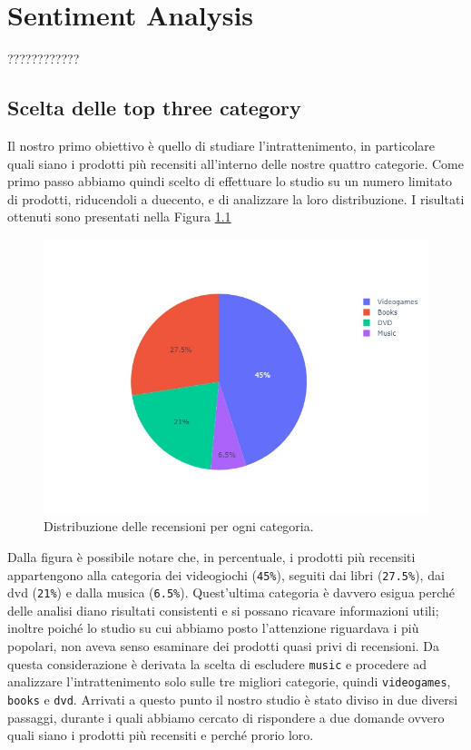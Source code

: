\chapter{Sentiment Analysis}
	????????????

	\section{Scelta delle top three category}
		Il nostro primo obiettivo è quello di studiare l'intrattenimento, in particolare quali siano i prodotti più recensiti all'interno delle nostre quattro categorie. Come primo passo abbiamo  quindi scelto di effettuare lo studio su un numero limitato di prodotti, riducendoli a duecento, e di analizzare la loro distribuzione. I risultati ottenuti sono presentati nella Figura \ref{fig:pie_category}
		
		\begin{figure} [h]
			\includegraphics[width=\textwidth]{Figure/pie_category}
			\caption{Distribuzione delle recensioni per ogni categoria.}
			\label{fig:pie_category}
		\end{figure}
	
		Dalla figura è possibile notare che, in percentuale, i prodotti più recensiti appartengono alla categoria dei videogiochi (\verb|45%|), seguiti dai libri (\verb|27.5%|), dai dvd (\verb|21%|) e dalla musica (\verb|6.5%|). Quest'ultima categoria è davvero esigua perché delle analisi diano risultati consistenti e si possano ricavare informazioni utili; inoltre poiché lo studio su cui abbiamo posto l'attenzione riguardava i più popolari, non aveva senso esaminare dei prodotti quasi privi di recensioni. Da questa considerazione è derivata la scelta di escludere \verb|music| e procedere ad analizzare l'intrattenimento solo sulle tre migliori categorie, quindi \verb|videogames|, \verb|books| e \verb|dvd|. Arrivati a questo punto il nostro studio è stato diviso in due diversi passaggi, durante i quali abbiamo cercato di rispondere a due domande ovvero quali siano i prodotti più recensiti e perché prorio loro. 
		
